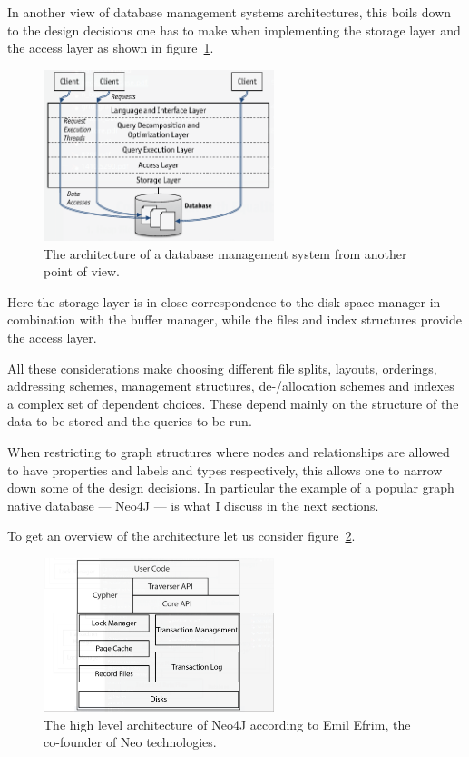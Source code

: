 \documentclass[a4paper,10pt]{article}
\begin{document}
In another view of database management systems architectures, this boils down to the design decisions one has to make when implementing the storage layer and the access layer as shown in figure~\ref{dbms_arch_layers}.

\begin{figure}[htp]\label{dbms_arch_layers}
 \begin{center}
  \includegraphics[keepaspectratio,width=0.6\textwidth]{img/layered_RDBMS.png}
 \end{center}
 \caption{The architecture of a database management system from another point of view.} %
\end{figure}

Here the storage layer is in close correspondence to the disk space manager in combination with the buffer manager, while the files and index structures provide the access layer.

All these considerations make choosing different file splits, layouts, orderings, addressing schemes, management structures, de-/allocation schemes and indexes a complex set of dependent choices. 
These depend mainly on the structure of the data to be stored and the queries to be run. 

When restricting to graph structures where nodes and relationships are allowed to have properties and labels and types respectively, this allows one to narrow down some of the design decisions. In particular the example of a popular graph native database --- Neo4J --- is what I discuss in the next sections. 

To get an overview of the architecture let us consider figure~\ref{N4J_HLA_Emil}. 

\begin{figure}[htp]\label{N4J_HLA_Emil}
 \begin{center}
  \includegraphics[keepaspectratio,width=0.6\textwidth]{img/N4J_HLA_Emil.png}
 \end{center}
 \caption{The high level architecture of Neo4J according to Emil Efrim, the co-founder of Neo technologies.} %
\end{figure}
\end{document}

